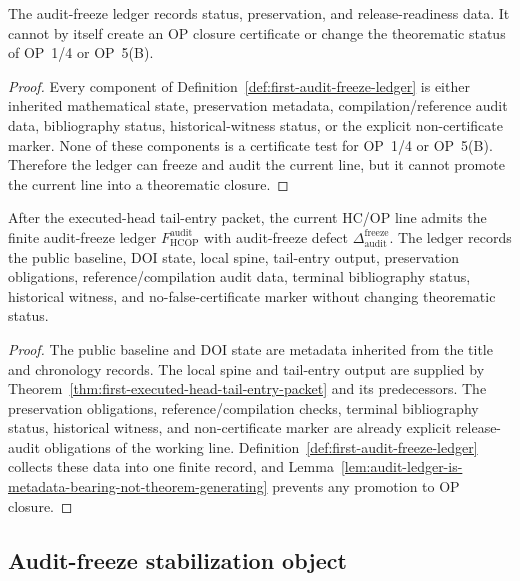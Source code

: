 \begin{lemma}
\label{lem:audit-ledger-is-metadata-bearing-not-theorem-generating}
The audit-freeze ledger records status, preservation, and release-readiness data.  It cannot by itself create an OP closure certificate or change the theorematic status of OP~1/4 or OP~5(B).
\end{lemma}

\begin{proof}
Every component of Definition~\ref{def:first-audit-freeze-ledger} is either inherited mathematical state, preservation metadata, compilation/reference audit data, bibliography status, historical-witness status, or the explicit non-certificate marker.  None of these components is a certificate test for OP~1/4 or OP~5(B).  Therefore the ledger can freeze and audit the current line, but it cannot promote the current line into a theorematic closure.
\end{proof}

\begin{theorem}
\label{thm:first-audit-freeze-ledger}
After the executed-head tail-entry packet, the current HC/OP line admits the finite audit-freeze ledger \(F_{\mathrm{HCOP}}^{\mathrm{audit}}\) with audit-freeze defect \(\Delta_{\mathrm{audit}}^{\mathrm{freeze}}\).  The ledger records the public baseline, DOI state, local spine, tail-entry output, preservation obligations, reference/compilation audit data, terminal bibliography status, historical witness, and no-false-certificate marker without changing theorematic status.
\end{theorem}

\begin{proof}
The public baseline and DOI state are metadata inherited from the title and chronology records.  The local spine and tail-entry output are supplied by Theorem~\ref{thm:first-executed-head-tail-entry-packet} and its predecessors.  The preservation obligations, reference/compilation checks, terminal bibliography status, historical witness, and non-certificate marker are already explicit release-audit obligations of the working line.  Definition~\ref{def:first-audit-freeze-ledger} collects these data into one finite record, and Lemma~\ref{lem:audit-ledger-is-metadata-bearing-not-theorem-generating} prevents any promotion to OP closure.
\end{proof}

\subsection{Audit-freeze stabilization object}
\label{subsec:audit-freeze-stabilization-object}

